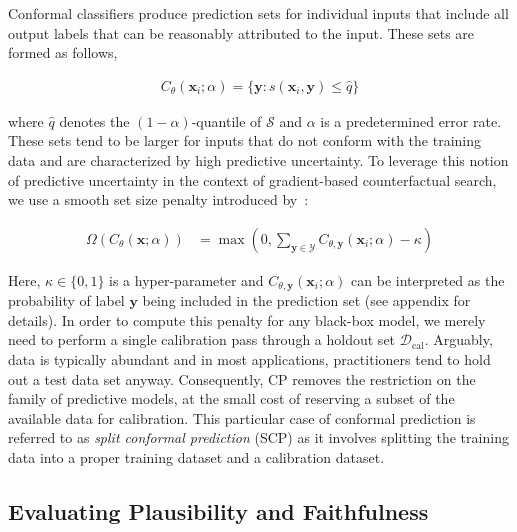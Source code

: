 Conformal classifiers produce prediction sets for individual inputs that include all output labels that can be reasonably attributed to the input. These sets are formed as follows,

\begin{equation}\label{eq:scp}
  \begin{aligned}
    C_{\theta}(\mathbf{x}_i;\alpha)=\{\mathbf{y}: s(\mathbf{x}_i,\mathbf{y}) \le \hat{q}\}
  \end{aligned}
\end{equation}

where $\hat{q}$ denotes the $(1-\alpha)$-quantile of $\mathcal{S}$ and $\alpha$ is a predetermined error rate. These sets tend to be larger for inputs that do not conform with the training data and are characterized by high predictive uncertainty. To leverage this notion of predictive uncertainty in the context of gradient-based counterfactual search, we use a smooth set size penalty introduced by~\citet{stutz2022learning}:

\begin{equation}\label{eq:setsize}
  \begin{aligned}
    \Omega(C_{\theta}(\mathbf{x};\alpha))&=\max \left(0, \sum_{\mathbf{y}\in\mathcal{Y}}C_{\theta,\mathbf{y}}(\mathbf{x}_i;\alpha) - \kappa \right)
  \end{aligned}
\end{equation}

Here, $\kappa \in \{0,1\}$ is a hyper-parameter and $C_{\theta,\mathbf{y}}(\mathbf{x}_i;\alpha)$ can be interpreted as the probability of label $\mathbf{y}$ being included in the prediction set (see appendix for details). In order to compute this penalty for any black-box model, we merely need to perform a single calibration pass through a holdout set $\mathcal{D}_{\text{cal}}$. Arguably, data is typically abundant and in most applications, practitioners tend to hold out a test data set anyway. Consequently, CP removes the restriction on the family of predictive models, at the small cost of reserving a subset of the available data for calibration. This particular case of conformal prediction is referred to as \textit{split conformal prediction} (SCP) as it involves splitting the training data into a proper training dataset and a calibration dataset.

\subsection{Evaluating Plausibility and Faithfulness}

